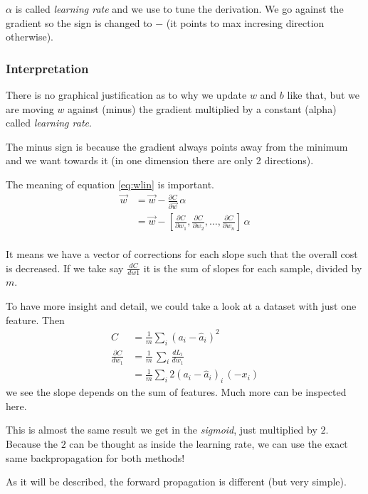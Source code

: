 $\alpha$ is called \textit{learning rate} and we use to tune the derivation. We go against the gradient so the sign is changed to $-$ (it points to max incresing direction otherwise).

\subsubsection{Interpretation}

There is no graphical justification as to why we update $w$ and $b$ like that, but we are moving $w$ against (minus) the gradient multiplied by a constant (alpha) called \textit{learning rate}.

The minus sign is because the gradient always points away from the minimum and we want towards it (in one dimension there are only 2 directions). 

The meaning of equation \ref{eq:wlin} is important.
\begin{align}
  \vec{w} &= \vec{w} -\frac{\partial C}{\partial \vec{w}}\,\alpha\\
  &= \vec{w} -[\frac{\partial C}{\partial w_1}, \frac{\partial C}{\partial w_2},\ldots, \frac{\partial C}{\partial w_n}]\,\alpha\\
\end{align}

It means we have a vector of corrections for each slope such that the overall cost is decreased. If we take say $\frac{dC}{dw1}$ it is the sum of slopes for each sample, divided by $m$. 

To have more insight and detail, we could take a look at a dataset with just one feature. Then 
\begin{align}
  C &= \frac{1}{m}\sum_i(a_i - \hat{a}_i)^2 \\ 
  \frac{\partial C}{dw_1}&= \frac{1}{m}\,\sum_i \frac{dL_i}{dw_1} \\
  &= \frac{1}{m}\sum_i 2(a_i - \hat{a}_i)_i\,(-x_i)
\end{align}
we see the slope depends on the sum of features. Much more can be inspected here.

This is almost the same result we get in the \textit{sigmoid}, just multiplied by $2$. Because the $2$ can be thought as inside the learning rate, we can use the exact same backpropagation for both methods!

As it will be described, the forward propagation is different (but very simple).


